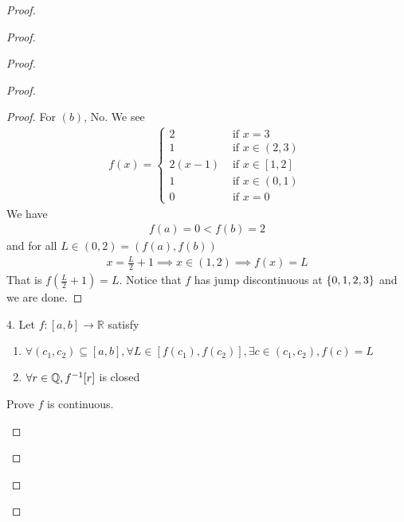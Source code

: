 \documentclass{report}
\begin{document}
\begin{proof}
\begin{proof}
\begin{proof}
\begin{proof}
\begin{proof}
For $(b)$, No. We see 
\begin{align*}
f(x)=\begin{cases}
  2& \text{ if  }x=3\\
  1& \text{ if  }x\in (2,3)\\
  2(x-1)& \text{ if $x\in [1,2]$ }\\
  1& \text{ if  }x\in (0,1)\\
  0& \text{ if  }x=0
\end{cases}
\end{align*}
We have 
\begin{align*}
f(a)=0<f(b)=2
\end{align*}
and for all $L\in (0,2)=(f(a),f(b))$ 
\begin{align*}
x=\frac{L}{2}+1\implies x\in (1,2)\implies f(x)=L
\end{align*}
That is $f(\frac{L}{2}+1)=L$. Notice that $f$ has jump discontinuous at  $\{ 0,1,2,3 \}$ and we are done.
\end{proof}
\begin{question}{}{}
4. Let \( f: [a, b] \rightarrow \mathbb{R} \) satisfy  
\begin{enumerate}[label=(\alph*)]
  \item $\forall (c_1,c_2)\subseteq [a,b], \forall L \in [f(c_1),f(c_2)],\exists  c\in (c_1,c_2),f(c)=L$
  \item $\forall r\in\mathbb{Q}, f^{-1}[r]$ is closed
\end{enumerate}
Prove $f$ is continuous.\\


\end{question}
\end{proof}
\end{proof}
\end{proof}
\end{proof}
\end{document}
